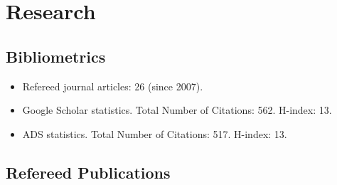 \documentclass[a4paper,10pt]{article} %
\begin{document}
\color{red}
\section{Research}
\color{black}

\subsection{Bibliometrics}
\begin{itemize}
\item Refereed journal articles:  26 (since 2007).
\item Google Scholar statistics. Total Number of Citations: 562. H-index: 13.
\item ADS statistics. Total Number of Citations: 517. H-index: 13.
\end{itemize}
\subsection{Refereed Publications}
\end{document}
